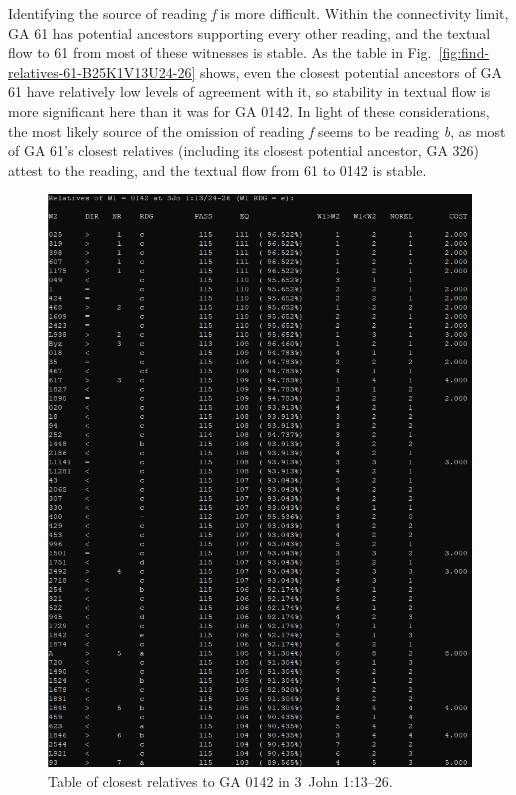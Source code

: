 \documentclass[a4paper, 12pt]{article}
\begin{document}
	Identifying the source of reading \emph{f} is more difficult. Within the connectivity limit, GA 61 has potential ancestors supporting every other reading, and the textual flow to 61 from most of these witnesses is stable. As the table in Fig.~\ref{fig:find-relatives-61-B25K1V13U24-26} shows, even the closest potential ancestors of GA 61 have relatively low levels of agreement with it, so stability in textual flow is more significant here than it was for GA 0142. In light of these considerations, the most likely source of the omission of reading \emph{f} seems to be reading \emph{b}, as most of GA 61's closest relatives (including its closest potential ancestor, GA 326) attest to the reading, and the textual flow from 61 to 0142 is stable.
	
	\begin{figure}[h!]
		\centering
		\includegraphics[width=\textwidth]{../graphics/find-relatives-0142-B25K1V13U24-26.png}
		\caption{Table of closest relatives to GA 0142 in 3~John 1:13–26.}
		\label{fig:find-relatives-0142-B25K1V13U24-26}
	\end{figure}
	
\end{document}
